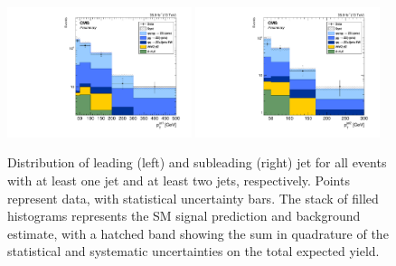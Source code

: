 \begin{figure}[htbp]
  \begin{center}
    \includegraphics[width=0.48\textwidth]{results/j1Pt.pdf}
    \includegraphics[width=0.48\textwidth]{results/j2Pt.pdf}
    \caption[Transverse momentum of the leading and subleading jets]{
        Distribution of leading (left) and subleading (right) jet {\pt} for all {\ZZ} events with at least one jet and at least two jets, respectively.
        Points represent data, with statistical uncertainty bars.
        The stack of filled histograms represents the SM signal prediction and background estimate, with a hatched band showing the sum in quadrature of the statistical and systematic uncertainties on the total expected yield.
      }\label{fig:jetPt}
  \end{center}
\end{figure}

